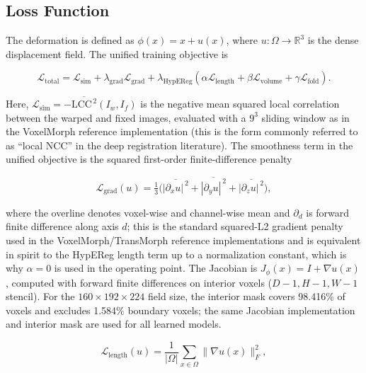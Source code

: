 \documentclass[jimaging,article,submit,pdftex,moreauthors]{Definitions/mdpi}
\begin{document}
\subsection{Loss Function}
\label{sec:loss}
The deformation is defined as \(\phi(x)=x+u(x)\), where \(u:\Omega\rightarrow\mathbb{R}^3\) is the dense displacement field. The unified training objective is
\begin{linenomath}
\begin{equation}
\mathcal{L}_{\mathrm{total}}
=
\mathcal{L}_{\mathrm{sim}}
+
\lambda_{\mathrm{grad}}\mathcal{L}_{\mathrm{grad}}
+
\lambda_{\mathrm{HypEReg}}\left(
\alpha \mathcal{L}_{\mathrm{length}} + \beta \mathcal{L}_{\mathrm{volume}} + \gamma \mathcal{L}_{\mathrm{fold}}
\right).
\end{equation}
\end{linenomath}
Here, \(\mathcal{L}_{\mathrm{sim}}=-\overline{\mathrm{LCC}^{\,2}}(I_w,I_f)\) is the negative mean squared local correlation between the warped and fixed images, evaluated with a \(9^3\) sliding window as in the VoxelMorph reference implementation \cite{balakrishnan2019voxelmorph} (this is the form commonly referred to as ``local NCC'' in the deep registration literature). The smoothness term in the unified objective is the squared first-order finite-difference penalty
\begin{linenomath}
\begin{equation}
\mathcal{L}_{\mathrm{grad}}(u)
=
\tfrac{1}{3}\Big(\overline{|\partial_x u|^{\,2}}+\overline{|\partial_y u|^{\,2}}+\overline{|\partial_z u|^{\,2}}\Big),
\end{equation}
\end{linenomath}
where the overline denotes voxel-wise and channel-wise mean and \(\partial_d\) is forward finite difference along axis \(d\); this is the standard squared-L2 gradient penalty used in the VoxelMorph/TransMorph reference implementations and is equivalent in spirit to the HypEReg length term up to a normalization constant, which is why \(\alpha=0\) is used in the operating point. The Jacobian is \(J_{\phi}(x)=I+\nabla u(x)\), computed with forward finite differences on interior voxels (\(D-1,H-1,W-1\) stencil). For the \(160\times192\times224\) field size, the interior mask covers 98.416\% of voxels and excludes 1.584\% boundary voxels; the same Jacobian implementation and interior mask are used for all learned models.
\begin{linenomath}
\begin{equation}
\mathcal{L}_{\mathrm{length}}(u)=\frac{1}{|\Omega|}\sum_{x\in\Omega}\|\nabla u(x)\|_F^2,
\end{equation}
\end{linenomath}
\end{document}
